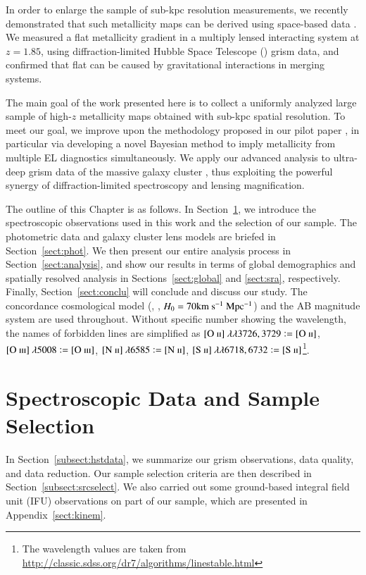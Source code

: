 In order to enlarge the sample of sub-kpc resolution measurements, we recently demonstrated that such metallicity maps can be
derived using space-based data \citep{2015AJ....149..107J}. We measured a flat metallicity gradient in a multiply lensed
interacting system at $z=1.85$, using diffraction-limited Hubble Space Telescope (\hst) grism data, and confirmed that flat \mgs 
can be caused by gravitational interactions in merging systems.

The main goal of the work presented here is to collect a uniformly analyzed large sample of high-$z$ metallicity maps obtained
with sub-kpc spatial resolution. To meet our goal, we improve upon the methodology proposed in our pilot paper
\citep{2015AJ....149..107J}, in particular via developing a novel Bayesian method to imply metallicity from multiple EL
diagnostics simultaneously. We apply our advanced analysis to ultra-deep grism data of the massive galaxy cluster \clyi, thus
exploiting the powerful synergy of \hst diffraction-limited spectroscopy and lensing magnification.

The outline of this Chapter is as follows. In Section~\ref{sect:spec}, we introduce the spectroscopic observations used in this work
and the selection of our \mg sample. The photometric data and galaxy cluster lens models are briefed in Section~\ref{sect:phot}.
We then present our entire analysis process in Section~\ref{sect:analysis}, and show our results in terms of global demographics
and spatially resolved analysis in Sections~\ref{sect:global} and \ref{sect:sra}, respectively.  Finally,
Section~\ref{sect:conclu} will conclude and discuss our study. The concordance cosmological model (, ,
$H_0=70\rm km~s^{-1}~Mpc^{-1}$) and the AB magnitude system \citep{1983ApJ...266..713O} are used throughout.  Without specific number
showing the wavelength, the names of forbidden lines are simplified as $[\textrm{O}~\textsc{ii}]~\lambda\lambda3726,3729\vcentcolon=[\textrm{O}~\textsc{ii}]$,
$[\textrm{O}~\textsc{iii}]~\lambda5008\vcentcolon=[\textrm{O}~\textsc{iii}]$, $[\textrm{N}~\textsc{ii}]~\lambda6585\vcentcolon=[\textrm{N}~\textsc{ii}]$, $[\textrm{S}~\textsc{ii}]~\lambda\lambda6718,6732\vcentcolon=[\textrm{S}~\textsc{ii}]$\footnote{The
wavelength values are taken from \url{http://classic.sdss.org/dr7/algorithms/linestable.html}}.


\section{Spectroscopic Data and Sample Selection}\label{sect:spec}

In Section~\ref{subsect:hstdata}, we summarize our \hst grism observations, data quality, and data reduction.
Our sample selection criteria are then described in Section~\ref{subsect:srcselect}.
We also carried out some ground-based integral field unit (IFU) observations on part of our sample, which are presented in 
Appendix~\ref{sect:kinem}.

